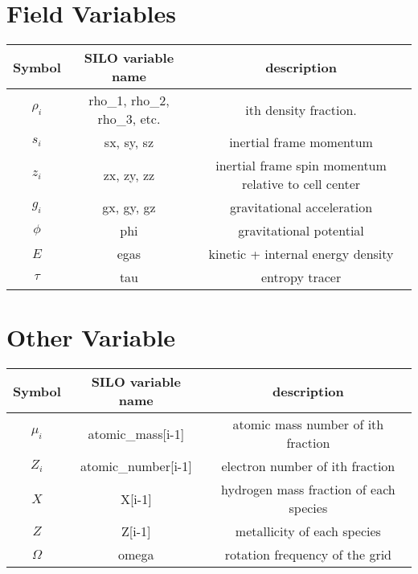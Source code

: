\documentclass{article}
\begin{document}
\section{ Field Variables }
\begin{tabular}{|c|c|c|}
\hline
Symbol & SILO variable name & description \\
\hline
$\rho_i$ & rho\_1, rho\_2, rho\_3, etc. & ith density fraction. \\
$s_i$ & sx, sy, sz & inertial frame momentum \\
$z_i$ & zx, zy, zz & inertial frame spin momentum relative to cell center \\
$g_i$ & gx, gy, gz & gravitational acceleration \\
$\phi$ & phi & gravitational potential \\
$E$ & egas & kinetic + internal energy density \\
$\tau$ & tau & entropy tracer \\
\hline
\end{tabular}

\section{ Other Variable}




\begin{tabular}{|c|c|c|}
\hline
Symbol & SILO variable name & description \\
\hline
$\mu_i$ & atomic\_mass[i-1]  & atomic mass number of ith fraction \\ 
$Z_i$ & atomic\_number[i-1]  & electron number of ith fraction \\ 
$X$ & X[i-1] & hydrogen mass fraction of each species \\ 
$Z$ & Z[i-1] & metallicity of each species \\ 
$\Omega$ & omega & rotation frequency of the grid \\
\hline
\end{tabular}
\end{document}
